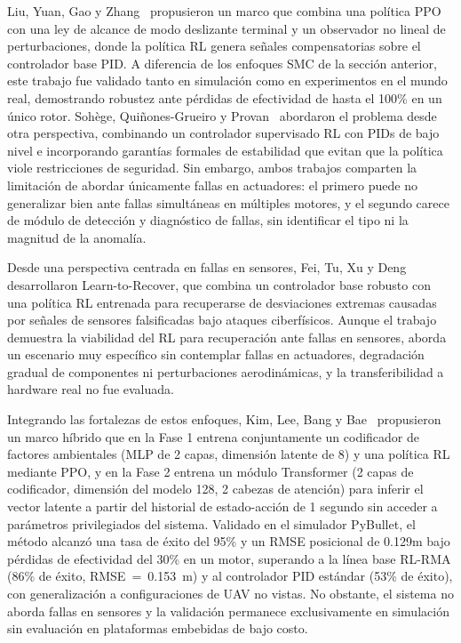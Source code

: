 Liu, Yuan, Gao y Zhang~\cite{liu2024} propusieron un marco que combina una política PPO con una ley de alcance de modo deslizante terminal y un observador no lineal de perturbaciones, donde la política RL genera señales compensatorias sobre el controlador base PID. A diferencia de los enfoques SMC de la sección anterior, este trabajo fue validado tanto en simulación como en experimentos en el mundo real, demostrando robustez ante pérdidas de efectividad de hasta el 100\% en un único rotor. Sohège, Quiñones-Grueiro y Provan~\cite{sohege2021} abordaron el problema desde otra perspectiva, combinando un controlador supervisado RL con PIDs de bajo nivel e incorporando garantías formales de estabilidad que evitan que la política viole restricciones de seguridad. Sin embargo, ambos trabajos comparten la limitación de abordar únicamente fallas en actuadores: el primero puede no generalizar bien ante fallas simultáneas en múltiples motores, y el segundo carece de módulo de detección y diagnóstico de fallas, sin identificar el tipo ni la magnitud de la anomalía.

Desde una perspectiva centrada en fallas en sensores, Fei, Tu, Xu y Deng~\cite{fei2020} desarrollaron Learn-to-Recover, que combina un controlador base robusto con una política RL entrenada para recuperarse de desviaciones extremas causadas por señales de sensores falsificadas bajo ataques ciberfísicos. Aunque el trabajo demuestra la viabilidad del RL para recuperación ante fallas en sensores, aborda un escenario muy específico sin contemplar fallas en actuadores, degradación gradual de componentes ni perturbaciones aerodinámicas, y la transferibilidad a hardware real no fue evaluada.

Integrando las fortalezas de estos enfoques, Kim, Lee, Bang y Bae~\cite{kim2025} propusieron un marco híbrido que en la Fase 1 entrena conjuntamente un codificador de factores ambientales (MLP de 2 capas, dimensión latente de 8) y una política RL mediante PPO, y en la Fase 2 entrena un módulo Transformer (2 capas de codificador, dimensión del modelo 128, 2 cabezas de atención) para inferir el vector latente a partir del historial de estado-acción de 1 segundo sin acceder a parámetros privilegiados del sistema. Validado en el simulador PyBullet, el método alcanzó una tasa de éxito del 95\% y un RMSE posicional de 0.129m bajo pérdidas de efectividad del 30\% en un motor, superando a la línea base RL-RMA (86\% de éxito, RMSE~=~0.153~m) y al controlador PID estándar (53\% de éxito), con generalización a configuraciones de UAV no vistas. No obstante, el sistema no aborda fallas en sensores y la validación permanece exclusivamente en simulación sin evaluación en plataformas embebidas de bajo costo.

